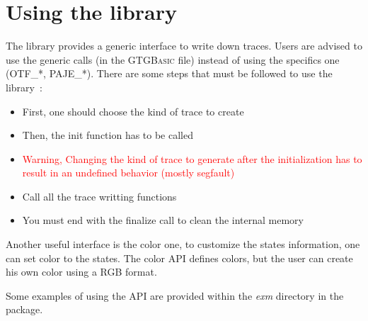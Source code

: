 \section{Using the \GTG{} library}
The \GTG{} library provides a generic interface to write down traces. Users are 
advised to use the generic calls (in the \textsc{GTGBasic} file) instead of 
using the specifics one (OTF\_*, PAJE\_*). There are some steps that must
be followed to use the library~:
\begin{itemize}
\item First, one should choose the kind of trace to create
\item Then, the init function has to be called
\item \textcolor{red}{Warning, Changing the kind of trace to generate after
the initialization has to result in an undefined behavior (mostly segfault)}
\item Call all the trace writting functions
\item You must end with the finalize call to clean the internal memory
\end{itemize}

Another useful interface is the color one, to customize the states 
information, one can set color to the states. The color API defines
colors, but the user can create his own color using a RGB format.

Some examples of using the API are provided within the \textit{exm} directory
in the package.

